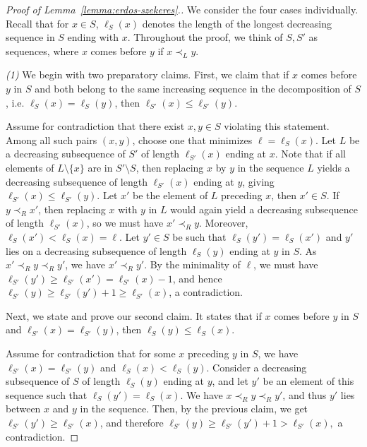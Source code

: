 \documentclass[11pt]{amsart}
\theoremstyle{definition}
\begin{document}
\begin{proof}[Proof of Lemma~\ref{lemma:erdos-szekeres}.]
We consider the four cases individually. Recall that for $x\in S$, $\ell_S(x)$ denotes the length of the longest decreasing sequence in $S$ ending with $x$. Throughout the proof, we think of $S, S'$ as sequences, where $x$ comes before $y$ if $x\prec_L y$.

\bigskip
\noindent
\textit{(1)} We begin with two preparatory claims. First, we claim that if $x$ comes before $y$ in $S$ and both belong to the same increasing sequence in the decomposition of $S$, i.e. $\ell_S(x)=\ell_S(y)$, then $\ell_{S'}(x) \leq \ell_{S'}(y)$.
    
Assume for contradiction that there exist $x,y\in S$ violating this statement.
Among all such pairs $(x,y)$, choose one that minimizes $\ell=\ell_S(x)$.
Let $L$ be a decreasing subsequence of $S'$ of length $\ell_{S'}(x)$ ending at $x$.
Note that if all elements of $L\setminus\{x\}$ are in $S'\setminus S$, then replacing $x$ by $y$ in the sequence $L$ yields a decreasing subsequence of length $\ell_{S'}(x)$ ending at $y$, giving $\ell_{S'}(x) \leq \ell_{S'}(y)$. Let $x'$ be the element of $L$ preceding $x$, then $x'\in S$. If $y\prec_R x'$, then replacing $x$ with $y$ in $L$ would again yield a decreasing subsequence of length $\ell_{S'}(x)$, so we must have $x'\prec_R y$.
Moreover, $\ell_S(x')<\ell_S(x)=\ell$. Let $y'\in S$ be such that $\ell_S(y') = \ell_S(x')$ and $y'$ lies on a decreasing subsequence of length $\ell_S(y)$ ending at $y$ in $S$. As $x'\prec_R y\prec_R y'$, we have $x'\prec_R y'$. By the minimality of $\ell$, we must have $\ell_{S'}(y') \geq \ell_{S'}(x') = \ell_{S'}(x) - 1$, and hence $\ell_{S'}(y) \geq \ell_{S'}(y') + 1 \geq \ell_{S'}(x)$, a contradiction.
\medskip

Next, we state and prove our second claim. It states that if $x$ comes before $y$ in $S$ and $\ell_{S'}(x)=\ell_{S'}(y)$, then $\ell_{S}(y) \leq \ell_{S}(x)$.

Assume for contradiction that for some $x$ preceding $y$ in $S$, we have $\ell_{S'}(x) = \ell_{S'}(y)$ and $\ell_S(x) < \ell_S(y)$.
Consider a decreasing subsequence of $S$  of length $\ell_S(y)$ ending at $y$, and let $y'$ be an element of this sequence such that $\ell_S(y')=\ell_S(x)$.
We have $x\prec_R y\prec_R y'$, and thus $y'$ lies between $x$ and $y$ in the sequence.
Then, by the previous claim, we get $\ell_{S'}(y') \geq \ell_{S'}(x)$, and therefore
    $\ell_{S'}(y) \geq  \ell_{S'}(y') + 1 > \ell_{S'}(x),$
a contradiction.


\end{proof}
\end{document}
